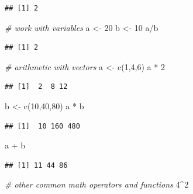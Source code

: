 \documentclass[
  12pt,
]{style/krantz}
\newenvironment{Shaded}{\begin{snugshade}}{\end{snugshade}}
\newcommand{\CommentTok}[1]{\textcolor[rgb]{0.56,0.35,0.01}{\textit{#1}}}
\newcommand{\DecValTok}[1]{\textcolor[rgb]{0.00,0.00,0.81}{#1}}
\newcommand{\FunctionTok}[1]{\textcolor[rgb]{0.00,0.00,0.00}{#1}}
\newcommand{\NormalTok}[1]{#1}
\newcommand{\OtherTok}[1]{\textcolor[rgb]{0.56,0.35,0.01}{#1}}
\newcommand{\SpecialCharTok}[1]{\textcolor[rgb]{0.00,0.00,0.00}{#1}}
\begin{document}
\begin{verbatim}
## [1] 2
\end{verbatim}

\begin{Shaded}
\begin{Highlighting}[]
\CommentTok{\# work with variables}
\NormalTok{a }\OtherTok{\textless{}{-}} \DecValTok{20}
\NormalTok{b }\OtherTok{\textless{}{-}} \DecValTok{10}
\NormalTok{a}\SpecialCharTok{/}\NormalTok{b}
\end{Highlighting}
\end{Shaded}

\begin{verbatim}
## [1] 2
\end{verbatim}

\begin{Shaded}
\begin{Highlighting}[]
\CommentTok{\# arithmetic with vectors}
\NormalTok{a }\OtherTok{\textless{}{-}} \FunctionTok{c}\NormalTok{(}\DecValTok{1}\NormalTok{,}\DecValTok{4}\NormalTok{,}\DecValTok{6}\NormalTok{)}
\NormalTok{a }\SpecialCharTok{*} \DecValTok{2}
\end{Highlighting}
\end{Shaded}

\begin{verbatim}
## [1]  2  8 12
\end{verbatim}

\begin{Shaded}
\begin{Highlighting}[]
\NormalTok{b }\OtherTok{\textless{}{-}} \FunctionTok{c}\NormalTok{(}\DecValTok{10}\NormalTok{,}\DecValTok{40}\NormalTok{,}\DecValTok{80}\NormalTok{)}
\NormalTok{a }\SpecialCharTok{*}\NormalTok{ b}
\end{Highlighting}
\end{Shaded}

\begin{verbatim}
## [1]  10 160 480
\end{verbatim}

\begin{Shaded}
\begin{Highlighting}[]
\NormalTok{a }\SpecialCharTok{+}\NormalTok{ b }
\end{Highlighting}
\end{Shaded}

\begin{verbatim}
## [1] 11 44 86
\end{verbatim}

\begin{Shaded}
\begin{Highlighting}[]
\CommentTok{\# other common math operators and functions}
\DecValTok{4}\SpecialCharTok{\^{}}\DecValTok{2}
\end{Highlighting}
\end{Shaded}
\end{document}
